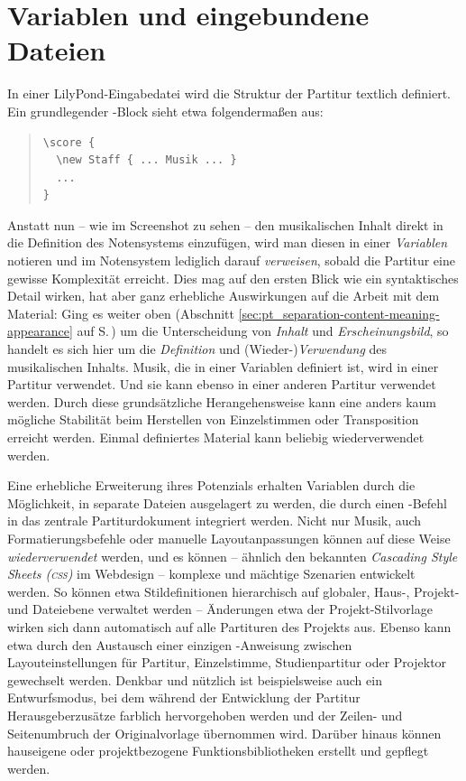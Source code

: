 \documentclass[DIV=12]{scrreprt}
\begin{document}
\section{Variablen und eingebundene Dateien}
\label{sec:pt_variables-includes}
In einer LilyPond-Eingabedatei wird die Struktur der Partitur textlich definiert.
Ein grundlegender -Block sieht etwa folgendermaßen aus:

\begin{quote}
\begin{minipage}{\textwidth}
\begin{verbatim}
\score {
  \new Staff { ... Musik ... }
  ...
}
\end{verbatim}
\end{minipage}
\end{quote}

Anstatt nun -- wie im Screenshot zu sehen -- den musikalischen Inhalt direkt in die Definition des Notensystems einzufügen, wird man diesen in einer \emph{Variablen} notieren und im Notensystem lediglich darauf \emph{verweisen}, sobald die Partitur eine gewisse Komplexität erreicht.
Dies mag auf den ersten Blick wie ein syntaktisches Detail wirken, hat aber ganz erhebliche Auswirkungen auf die Arbeit mit dem Material:
Ging es weiter oben (Abschnitt \ref{sec:pt_separation-content-meaning-appearance} auf S.\,\pageref{sec:pt_separation-content-meaning-appearance}) um die Unterscheidung von \emph{Inhalt} und \emph{Erscheinungsbild}, so handelt es sich hier um die \emph{Definition} und (Wieder-)\emph{Verwendung} des musikalischen Inhalts.
Musik, die in einer Variablen definiert ist, wird in einer Partitur verwendet.
Und sie kann ebenso in einer anderen Partitur verwendet werden.
Durch diese grundsätzliche Herangehensweise kann eine anders kaum mögliche Stabilität beim Herstellen von Einzelstimmen oder Transposition erreicht werden.
Einmal definiertes Material kann beliebig wiederverwendet werden.

\medskip
Eine erhebliche Erweiterung ihres Potenzials erhalten Variablen durch die Möglichkeit, in separate Dateien ausgelagert zu werden, die durch einen -Befehl in das zentrale Partiturdokument integriert werden.
Nicht nur Musik, auch Formatierungsbefehle oder manuelle Layoutanpassungen können auf diese Weise \emph{wiederverwendet} werden, und es können -- ähnlich den bekannten \emph{Cascading Style Sheets (\textsc{css})} im Webdesign -- komplexe und mächtige Szenarien entwickelt werden.
So können etwa Stildefinitionen hierarchisch auf globaler, Haus-, Projekt- und Dateiebene verwaltet werden -- Änderungen etwa der Projekt-Stilvorlage wirken sich dann automatisch auf alle Partituren des Projekts aus.
Ebenso kann etwa durch den Austausch einer einzigen -Anweisung zwischen Layouteinstellungen für Partitur, Einzelstimme, Studienpartitur oder Projektor gewechselt werden.
Denkbar und nützlich ist beispielsweise auch ein Entwurfsmodus, bei dem während der Entwicklung der Partitur Herausgeberzusätze farblich hervorgehoben werden und der Zeilen- und Seitenumbruch der Originalvorlage übernommen wird.
Darüber hinaus können hauseigene oder projektbezogene Funktionsbibliotheken erstellt und gepflegt werden.
\end{document}
